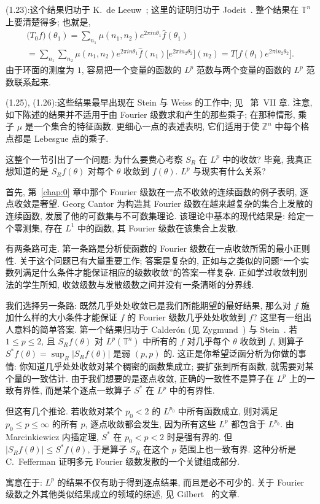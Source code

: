 \noindent (1.23):\quad 这个结果归功于 K.~de Leeuw~\cite{deleeuw}; 这里的证明归功于 Jodeit~\cite{jodeit}. 整个结果在 $\mathbb{T}^n$ 上要清楚得多; 也就是,
\begin{align*}
\bigl(T_0f\bigr)(\theta_1)=\sum_{n_1}\mu(n_1,n_2)e^{2\pi in\theta_1}\hat{f}(\theta_1)
  \\
=\sum_{n_1}\sum_{n_2}\mu(n_1,n_2)e^{2\pi in\theta_1}\hat{f}(n_1)\bigl[e^{2\pi in_2\theta_2}\bigr](n_2)=T\bigl[f(\theta_1)e^{2\pi in_2\theta_2}\bigr].
\end{align*}
由于环面的测度为 $1$, 容易把一个变量的函数的 $L^p$ 范数与两个变量的函数的 $L^p$ 范数联系起来.

\noindent (1.25), (1.26):\quad 这些结果最早出现在 Stein 与 Weiss 的工作中; 见~\cite{steinweiss} 第~VII 章. 注意, 如下陈述的结果并不适用于由 Fourier 级数求和产生的那些乘子; 在那种情形, 乘子 $\mu$ 是一个集合的特征函数. 更细心一点的表述表明, 它们适用于使 $\mathbb{Z}^n$ 中每个格点都是 Lebesgue 点的乘子.

这整个一节引出了一个问题: 为什么要费心考察 $S_R$ 在 $L^p$ 中的收敛? 毕竟, 我真正想知道的是 $S_Rf(\theta)$ 对每个 $\theta$ 收敛到 $f(\theta)$. $L^p$ 与现实有什么关系?

首先, 第~\ref{chap:0} 章中那个 Fourier 级数在一点不收敛的连续函数的例子表明, 逐点收敛是奢望. Georg Cantor 为构造其 Fourier 级数在越来越复杂的集合上发散的连续函数, 发展了他的可数集与不可数集理论. 该理论中基本的现代结果是: 给定一个零测集, 存在 $L^1$ 中的函数, 其 Fourier 级数在该集合上发散.

有两条路可走. 第一条路是分析使函数的 Fourier 级数在一点收敛所需的最小正则性. 关于这个问题已有大量重要工作; 答案是复杂的, 正如与之类似的问题``一个实数列满足什么条件才能保证相应的级数收敛''的答案一样复杂. 正如学过收敛判别法的学生所知, 收敛级数与发散级数之间并没有一条清晰的分界线.

我们选择另一条路: 既然几乎处处收敛已是我们所能期望的最好结果, 那么对 $f$ 施加什么样的大小条件才能保证 $f$ 的 Fourier 级数几乎处处收敛到 $f$? 这里有一组出人意料的简单答案. 第一个结果归功于 Calderón (见 Zygmund~\cite{zygmund}) 与 Stein~\cite{stein-limits}. 若 $1\leq p\leq 2$, 且 $S_Rf(\theta)$ 对 $L^p(\mathbb{T}^n)$ 中所有的 $f$ 对几乎每个 $\theta$ 收敛到 $f$, 则算子 $S^{\ast}f(\theta)=\sup_R|S_Rf(\theta)|$ 是弱 $(p,p)$ 的. 这正是你希望泛函分析为你做的事情: 你知道几乎处处收敛对某个稠密的函数集成立; 要扩张到所有函数, 就需要对某个量的一致估计. 由于我们想要的是逐点收敛, 正确的一致性不是算子在 $L^p$ 上的一致有界性, 而是某个逐点一致算子 $S^{\ast}$ 在 $L^p$ 中的有界性.

但这有几个推论. 若收敛对某个 $p_0<2$ 的 $L^{p_0}$ 中所有函数成立, 则对满足 $p_0\leq p\leq\infty$ 的所有 $p$, 逐点收敛都会发生, 因为所有这些 $L^p$ 都包含于 $L^{p_0}$. 由 Marcinkiewicz 内插定理, $S^{\ast}$ 在 $p_0<p<2$ 时是强有界的. 但 $|S_Rf(\theta)|\leq S^{\ast}f(\theta)$, 于是算子 $S_R$ 在这个 $p$ 范围上也一致有界. 这种分析是 C.~Fefferman 证明多元 Fourier 级数发散的一个关键组成部分.

寓意在于: $L^p$ 的结果不仅有助于得到逐点结果, 而且是必不可少的. 关于 Fourier 级数之外其他类似结果成立的领域的综述, 见 Gilbert~\cite{gilbert} 的文章.
